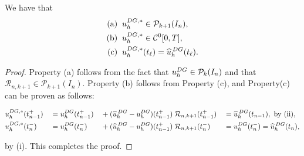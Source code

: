 \documentclass[10pt,a4paper]{amsart}
\begin{document}
\begin{proposition}
\label{proposition3.1}
We have that
 \begin{alignat*}{2}
 {\text{\rm(a)}}& \;\; u^{{\rm DG},*}_h \in \mathcal{P}_{k+1}(I_n),
 \\
 {\text{\rm(b)}}&  \;\; u^{{\rm DG},*}_h \in \mathcal{C}^0[0,T],
 \\
 {\text{\rm(c)}}&  \;\; u^{{\rm DG},*}_h(t_\ell)=\widehat{u}^{\,{\rm DG}}_h(t_\ell).
 \end{alignat*}
 \end{proposition}

 \begin{proof}
Property (a) follows from the fact that 
$u^{{\rm DG}}_h\in\mathcal{P}_k(I_n)$ and that  {$\mathcal{R}_{n,k+1} \in \mathcal{P}_{k+1}(I_n)$.} Property (b) follows from Property (c), and Property(c) can be proven as follows:


\small{
\begin{alignat*}{6}
&u^{{\rm DG},*}_h(t^+_{n-1})&&= u^{{\rm DG}}_h(t^+_{n-1})&&+(\widehat{u}^{\,{\rm DG}}_h-u^{{\rm DG}}_h)(t^+_{n-1}) \; \mathcal{R}_{n,k+1}(t^+_{n-1}) &&={\widehat{u}^{\,{\rm DG}}_h(t_{n-1})},\text{ by (ii),}
\\
&u^{{\rm DG},*}_h(t^-_{n})&&= u^{{\rm DG}}_h(t^-_{n})&&+(\widehat{u}^{\,{\rm DG}}_h-u^{{\rm DG}}_h)(t^+_{n-1}) \; \mathcal{R}_{n,k+1}(t^-_{n}) &&={u}^{{\rm DG}}_h(t^-_{n})= \widehat{u}^{\,{\rm DG}}_h(t_{n}),
\end{alignat*}
}

\noindent by (i). This completes the proof.
\end{proof}
\end{document}

